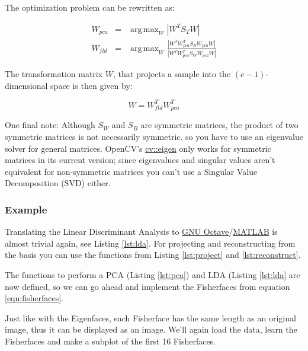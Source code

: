 The optimization problem can be rewritten as:

\begin{eqnarray}
W_{pca} & = & \operatorname{arg\,max}_{W} |W^T S_T W| \\
W_{fld} & = & \operatorname{arg\,max}_{W} \frac{|W^T W_{pca}^T S_{B} W_{pca} W|}{|W^T W_{pca}^T S_{W} W_{pca} W|}
\end{eqnarray}

The transformation matrix $W$, that projects a sample into the $(c-1)$-dimensional space is then given by:

\begin{equation} \label{eqn:fisherfaces}
W = W_{fld}^{T} W_{pca}^{T}
\end{equation}

One final note: Although $S_{W}$ and $S_{B}$ are symmetric matrices, the product of two symmetric matrices is not necessarily symmetric. so you have to use an eigenvalue solver for general matrices. OpenCV's \href{http://opencv.willowgarage.com/documentation/cpp/operations_on_arrays.html#cv-eigen}{cv::eigen} only works for symmetric matrices in its current version; since eigenvalues and singular values aren't equivalent for non-symmetric matrices you can't use a Singular Value Decomposition (SVD) either.


\subsubsection{Example}

\label{ssection:example_fisherfaces}

Translating the Linear Discriminant Analysis to \href{http://www.gnu.org/software/octave/}{GNU Octave}/\href{http://www.mathworks.com}{MATLAB} is almost trivial again, see Listing \ref{lst:lda}. For projecting and reconstructing from the basis you can use the functions from Listing \ref{lst:project} and \ref{lst:reconstruct}.



The functions to perform a PCA (Listing \ref{lst:pca}) and LDA (Listing \ref{lst:lda} are now defined, so we can go ahead and implement the Fisherfaces from equation \ref{eqn:fisherfaces}. 



Just like with the Eigenfaces, each Fisherface has the same length as an original image, thus it can be displayed as an image. We'll again load the data, learn the Fisherfaces and make a subplot of the first 16 Fisherfaces.

